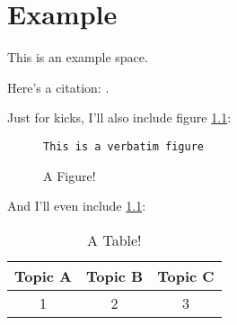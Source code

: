 \chapter{Example}\label{ch:ex}

This is an example space. 

Here's a citation: \cite{wagner_mcnp:_1992}.

Just for kicks, I'll also include figure \ref{fig:fig}:

\begin{figure}[h!]
\begin{Verbatim}[frame=single]
This is a verbatim figure
\end{Verbatim}
\caption{A Figure!}
\label{fig:fig}
\end{figure}

And I'll even include \ref{tab:tab}:

\begin{table} [h]
\centering
\begin{tabular} {|c|c|c|} 
\hline
Topic A & Topic B & Topic C \\
\hline
1       & 2       & 3        \\
\hline
\end{tabular}
\caption{A Table!}
\label{tab:tab}
\end{table}